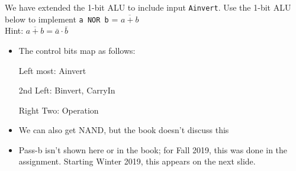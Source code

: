 \begin{frame}[fragile]
   \begin{tcolorbox}[enhanced,attach boxed title to top center={yshift=-3mm,yshifttext=-1mm},
  colback=red!5!white,colframe=red!75!black,colbacktitle=red!80!black,
  title=Try this,fonttitle=\bfseries,
  boxed title style={size=small,colframe=red!50!black} ]
We have extended the 1-bit ALU to include input \texttt{Ainvert}. Use the 1-bit ALU below to implement \texttt{a NOR b} = $\overline{a+b}$\\
Hint: $\overline{a+b} = \bar{a} \cdot \bar{b}$
\end{tcolorbox}
\begin{multicols}{2}

    \columnbreak

    \ifnum{}\fi
\end{multicols}  

  \BNotes\ifnum{}
  \begin{itemize}
  \item The control bits map as follows:

    Left most: Ainvert

    2nd Left: Binvert, CarryIn
    
    Right Two: Operation
    
  \item We can also get NAND, but the book doesn't discuss this
  \item Pass-b isn't shown here or in the book; for Fall 2019, this was
    done in the assignment.  Starting Winter 2019, this appears on the
    next slide.
  \end{itemize}
  \fi\ENotes
\end{frame}

\newpage

